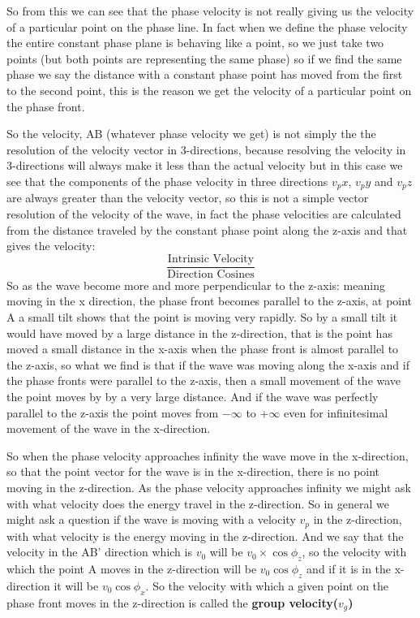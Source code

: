So from this we can see that the phase velocity is not really giving us the velocity of a particular point on the phase line. In fact when we define the phase velocity the entire constant phase plane is behaving like a point, so we just take two points (but both points are representing the same phase) so if we find the same phase we say the distance with a constant phase point has moved from the first to the second point, this is the reason we get the velocity of a particular point on the phase front.

So the velocity, AB (whatever phase velocity we get) is not simply the the resolution of the velocity vector in 3-directions, because resolving the velocity in 3-directions will always make it less than the actual velocity but in this case we see that the components of the phase velocity in three directions $v_px$, $v_py$ and $v_pz$ are always greater than the velocity vector, so this is not a simple vector resolution of the velocity of the wave, in fact the phase velocities are calculated from the distance traveled by the constant phase point along the z-axis and that gives the velocity:
\begin{dmath*}
\frac{\text{Intrinsic Velocity}}{\text{Direction Cosines}}
\end{dmath*}
So as the wave become more and more perpendicular to the z-axis: meaning moving in the x direction, the phase front becomes parallel to the z-axis, at point A a small tilt shows that the point is moving very rapidly. So by a small tilt it would have moved by a large distance in the z-direction, that is the point has moved a small distance in the x-axis when the phase front is almost parallel to the z-axis, so what we find is that if the wave was moving along the x-axis and if the phase fronts were parallel to the z-axis, then a small movement of the wave the point moves by by a very large distance. And if the wave was perfectly parallel to the z-axis the point moves from $-\infty$ to +$\infty$ even for infinitesimal movement of the wave in the x-direction.

So when the phase velocity approaches infinity the wave move in the x-direction, so that the point vector for the wave is in the x-direction, there is no point moving in the z-direction.
As the phase velocity approaches infinity we might ask with what velocity does the energy travel in the z-direction.
So in general we might ask a question if the wave is moving with a velocity $v_p$ in the z-direction, with what velocity is the energy moving in the z-direction.
And we say that the velocity in the AB' direction which is $v_0$ will be $v_0\times\cos\phi_{z}$, so the velocity with which the point A moves in the z-direction will be $v_0\cos\phi_{z}$ and if it is in the x-direction it will be $v_0\cos\phi_{x}$. So the velocity with which a given point on the phase front moves in the z-direction is called the \textbf{group velocity($v_g$)}

